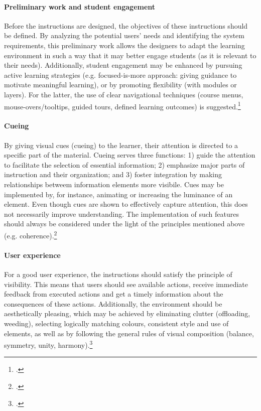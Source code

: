\paragraph{Preliminary work and student engagement} Before the instructions are designed, the objectives of these instructions should be defined. By analyzing the potential users' needs and identifying the system requirements, this preliminary work allows the designers to adapt the learning environment in such a way that it may better engage students (as it is relevant to their needs). Additionally, student engagement may be enhanced by pursuing active learning strategies (e.g. focused-is-more approach: giving guidance to motivate meaningful learning), or by promoting flexibility (with modules or layers). For the latter, the use of clear navigational techniques (course menus, mouse-overs/tooltips, guided tours, defined learning outcomes) is suggested.\footcites[Cf.][]{}

\paragraph{Cueing} By giving visual cues (cueing) to the learner, their attention is directed to a specific part of the material. Cueing serves three functions:  1) guide the attention to facilitate the selection of essential information; 2) emphasize major parts of instruction and their organization; and 3) foster integration by making relationships betweem information elements more visibile. Cues may be implemented by, for instance, animating or increasing the luminance of an element. Even though cues are shown to effectively capture attention, this does not necessarily improve understanding. The implementation of such features should always be considered under the light of the principles mentioned above (e.g. coherence).\footcites[Cf.][pp.114 et seq]{deKoningFrameworkAttentionCueing2009}[cf.][chapter 2, paragraph 14]{ClarkElearningscienceinstruction2016}

\paragraph{User experience} For a good user experience, the instructions should satisfy the principle of visibility. This means that users should see available actions, receive immediate feedback from executed actions and get a timely information about the consequences of these actions. Additionally, the environment should be aesthetically pleasing, which may be achieved by eliminating clutter (offloading, weeding), selecting logically matching colours, consistent style and use of elements, as well as by following the general rules of visual composition (balance, symmetry, unity, harmony).\footcites[Cf.][pp. 16 et seq]{LeeScreenDesignGuidelines1999}[cf.][pp. 16 et seq]{Nadelhoffer10BestPractices}[cf.][p.20]{KirshInteractivitymultimediainterfaces1997}

